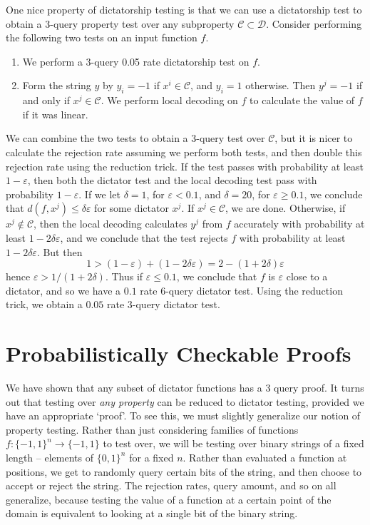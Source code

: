One nice property of dictatorship testing is that we can use a dictatorship test to obtain a 3-query property test over any subproperty $\mathcal{C} \subset \mathcal{D}$. Consider performing the following two tests on an input function $f$.
%
\begin{enumerate}
    \item We perform a 3-query 0.05 rate dictatorship test on $f$.
    \item Form the string $y$ by $y_i = -1$ if $x^i \in \mathcal{C}$, and $y_i = 1$ otherwise. Then $y^j = -1$ if and only if $x^j \in \mathcal{C}$. We perform local decoding on $f$ to calculate the value of $f$ if it was linear.
\end{enumerate}
%
We can combine the two tests to obtain a 3-query test over $\mathcal{C}$, but it is nicer to calculate the rejection rate assuming we perform both tests, and then double this rejection rate using the reduction trick. If the test passes with probability at least $1 - \varepsilon$, then both the dictator test and the local decoding test pass with probability $1 - \varepsilon$. If we let $\delta = 1$, for $\varepsilon < 0.1$, and $\delta = 20$, for $\varepsilon \geq 0.1$, we conclude that $d(f,x^j) \leq \delta \varepsilon$ for some dictator $x^j$. If $x^j \in \mathcal{C}$, we are done. Otherwise, if $x^j \not \in \mathcal{C}$, then the local decoding calculates $y^j$ from $f$ accurately with probability at least $1 - 2 \delta \varepsilon$, and we conclude that the test rejects $f$ with probability at least $1 - 2 \delta \varepsilon$. But then
%
\[ 1 > (1 - \varepsilon) + (1 - 2 \delta \varepsilon) = 2 - (1 + 2 \delta) \varepsilon \]
%
hence $\varepsilon > 1/(1 + 2 \delta)$. Thus if $\varepsilon \leq 0.1$, we conclude that $f$ is $\varepsilon$ close to a dictator, and so we have a $0.1$ rate 6-query dictator test. Using the reduction trick, we obtain a $0.05$ rate 3-query dictator test.

\section{Probabilistically Checkable Proofs}

We have shown that any subset of dictator functions has a 3 query proof. It turns out that testing over {\it any property} can be reduced to dictator testing, provided we have an appropriate `proof'. To see this, we must slightly generalize our notion of property testing. Rather than just considering families of functions $f: \{ -1, 1 \}^n \to \{ -1, 1 \}$ to test over, we will be testing over binary strings of a fixed length -- elements of $\{ 0, 1 \}^n$ for a fixed $n$. Rather than evaluated a function at positions, we get to randomly query certain bits of the string, and then choose to accept or reject the string. The rejection rates, query amount, and so on all generalize, because testing the value of a function at a certain point of the domain is equivalent to looking at a single bit of the binary string.

